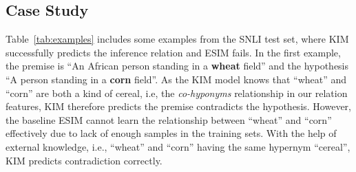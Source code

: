 \documentclass[11pt,a4paper]{article}
\begin{document}
\begin{table}[t!]
\renewcommand{\arraystretch}{0.9}
\centering
{}
\caption{Detailed Analysis on MultiNLI. }
\label{tab:error}
\end{table}

\subsection{Case Study}
Table~\ref{tab:examples} includes some examples from the SNLI test set, where KIM successfully predicts the inference relation and ESIM fails. In the first example, the premise is ``An African person standing in a \textbf{wheat} field'' and the hypothesis ``A person standing in a \textbf{corn} field''. As the KIM model knows that ``wheat'' and ``corn'' are both a kind of cereal, i.e, the \textit{co-hyponyms} relationship in our relation features, KIM therefore predicts the premise contradicts the  hypothesis. However, the baseline ESIM cannot learn the relationship between ``wheat'' and ``corn'' effectively due to lack of enough samples in the training sets. With the help of external knowledge, i.e., ``wheat'' and ``corn'' having the same hypernym ``cereal'', KIM predicts contradiction correctly.
\end{document}
